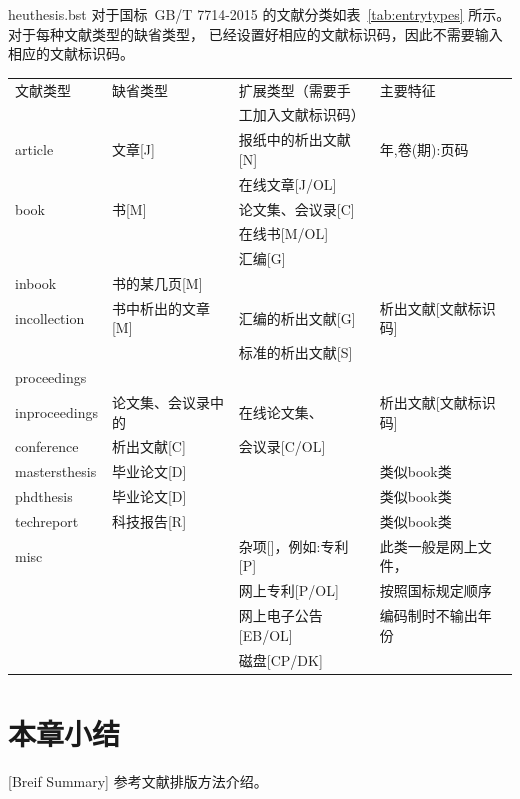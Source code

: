 heuthesis.bst 对于国标~GB/T 7714-2015 的文献分类如表~\ref{tab:entrytypes} 所示。对于每种文献类型的缺省类型，
已经设置好相应的文献标识码，因此不需要输入相应的文献标识码。

\begin{table}[htbp]
  \vspace{0.5em}\centering\wuhao
  \begin{tabular}{llll}
    \toprule[1.5pt]
    文献类型      & 缺省类型           & 扩展类型（需要手     & 主要特征             \\
                  &                    & 工加入文献标识码）   &                      \\
    \midrule[1pt]
    article       & 文章[J]            & 报纸中的析出文献[N]  & 年,卷(期):页码       \\
                  &                    & 在线文章[J/OL]       &                      \\
    book          & 书[M]              & 论文集、会议录[C]    &                      \\
                  &                    & 在线书[M/OL]         &                      \\
                  &                    & 汇编[G]              &                      \\
    inbook        & 书的某几页[M]      &                      &                      \\
    incollection  & 书中析出的文章[M]  & 汇编的析出文献[G]    & 析出文献[文献标识码] \\
                  &                    & 标准的析出文献[S]    &                      \\
    proceedings   &                    &                      &                      \\
    inproceedings & 论文集、会议录中的 & 在线论文集、         & 析出文献[文献标识码] \\
    conference    & 析出文献[C]        & 会议录[C/OL]         &                      \\
    mastersthesis & 毕业论文[D]        &                      & 类似book类           \\
    phdthesis     & 毕业论文[D]        &                      & 类似book类           \\
    techreport    & 科技报告[R]        &                      & 类似book类           \\
    misc          &                    & 杂项[]，例如:专利[P] & 此类一般是网上文件， \\
                  &                    & 网上专利[P/OL]       & 按照国标规定顺序     \\
                  &                    & 网上电子公告[EB/OL]  & 编码制时不输出年份   \\
                  &                    & 磁盘[CP/DK]          &                      \\
    \bottomrule[1.5pt]
  \end{tabular}
\end{table}

\section{本章小结}[Breif Summary]
参考文献排版方法介绍。
